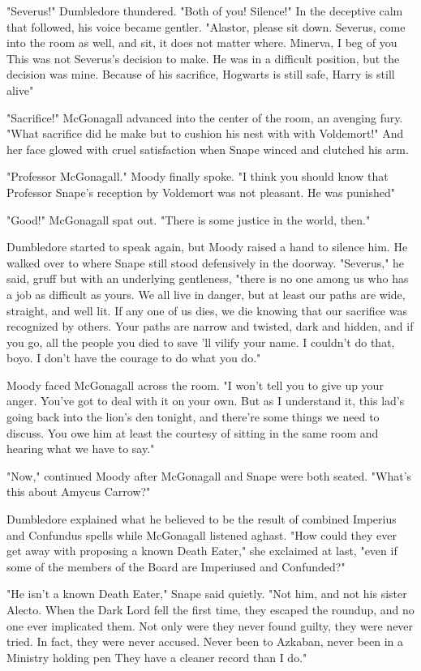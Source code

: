 "Severus!" Dumbledore thundered. "Both of you! Silence!" In the deceptive calm that followed, his voice became gentler. "Alastor, please sit down. Severus, come into the room as well, and sit, it does not matter where. Minerva, I beg of you{\el} This was not Severus's decision to make. He was in a difficult position, but the decision was mine. Because of his sacrifice, Hogwarts is still safe, Harry is still alive{\el}"

"Sacrifice!" McGonagall advanced into the center of the room, an avenging fury. "What sacrifice did he make but to cushion his nest with{\el} with{\el} Voldemort!" And her face glowed with cruel satisfaction when Snape winced and clutched his arm.

"Professor McGonagall." Moody finally spoke. "I think you should know that Professor Snape's reception by Voldemort was not pleasant. He was punished{\el}"

"Good!" McGonagall spat out. "There is some justice in the world, then."

Dumbledore started to speak again, but Moody raised a hand to silence him. He walked over to where Snape still stood defensively in the doorway. "Severus," he said, gruff but with an underlying gentleness, "there is no one among us who has a job as difficult as yours. We all live in danger, but at least our paths are wide, straight, and well lit. If any one of us dies, we die knowing that our sacrifice was recognized by others. Your paths are narrow and twisted, dark and hidden, and if you go, all the people you died to save 'll vilify your name. I couldn't do that, boyo. I don't have the courage to do what you do."

Moody faced McGonagall across the room. "I won't tell you to give up your anger. You've got to deal with it on your own. But as I understand it, this lad's going back into the lion's den tonight, and there're some things we need to discuss. You owe him at least the courtesy of sitting in the same room and hearing what we have to say."

"Now," continued Moody after McGonagall and Snape were both seated. "What's this about Amycus Carrow?"

Dumbledore explained what he believed to be the result of combined Imperius and Confundus spells while McGonagall listened aghast. "How could they ever get away with proposing a known Death Eater," she exclaimed at last, "even if some of the members of the Board are Imperiused and Confunded?"

"He isn't a known Death Eater," Snape said quietly. "Not him, and not his sister Alecto. When the Dark Lord fell the first time, they escaped the roundup, and no one ever implicated them. Not only were they never found guilty, they were never tried. In fact, they were never accused. Never been to Azkaban, never been in a Ministry holding pen{\el} They have a cleaner record than I do."

